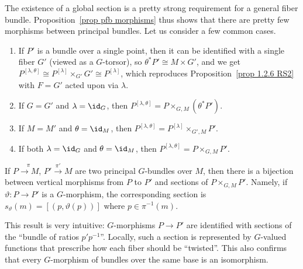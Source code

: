 \begin{example}
    The existence of a global section is a pretty strong requirement for a general fiber bundle. Proposition~\ref{prop pfb morphisms} thus shows that there are pretty few morphisms between principal bundles. Let us consider a few common cases.
    \begin{enumerate}
        \item If $P'$ is a bundle over a single point, then it can be identified with a single fiber $G'$ (viewed as a $G$-torsor), so $\theta^\ast P'\cong M\times G'$, and we get $P^{[\lambda,\theta]}\cong P^{[\lambda]}\times_{G'}G'\cong P^{[\lambda]}$, which reproduces Proposition~\ref{prop 1.2.6 RS2} with $F=G'$ acted upon via $\lambda$.
        \item If $G=G'$ and $\lambda=\id_G$, then $P^{[\lambda,\theta]}=P\times_{G,M}(\theta^\ast P')$. 
        \item If $M=M'$ and $\theta=\id_M$, then $P^{[\lambda,\theta]}=P^{[\lambda]}\times_{G',M}P'$. 
        \item If both $\lambda=\id_G$ and $\theta=\id_M$, then $P^{[\lambda,\theta]}=P\times_{G,M}P'$. 
    \end{enumerate}
\end{example}

\begin{cor}[{{\cite[Cor.~1.2.7]{RS2}}}]\label{cor 1.2.7 RS2}
    If $P\overset{\pi}{\to M}$, $P'\overset{\pi'}{\to}M$ are two principal $G$-bundles over $M$, then there is a bijection between vertical morphisms from $P$ to $P'$ and sections of $P\times_{G,M}P'$. Namely, if $\vartheta:P\to P'$ is a $G$-morphism, the corresponding section is $s_\vartheta(m)=[(p,\vartheta(p))]$ where $p\in\pi^{-1}(m)$.
\end{cor}
This result is very intuitive: $G$-morphisms $P\to P'$ are identified with sections of the ``bundle of ratios $p'p^{-1}$''. Locally, such a section is represented by $G$-valued functions that prescribe how each fiber should be ``twisted''. This also confirms that every $G$-morphism of bundles over the same base is an isomorphism.

